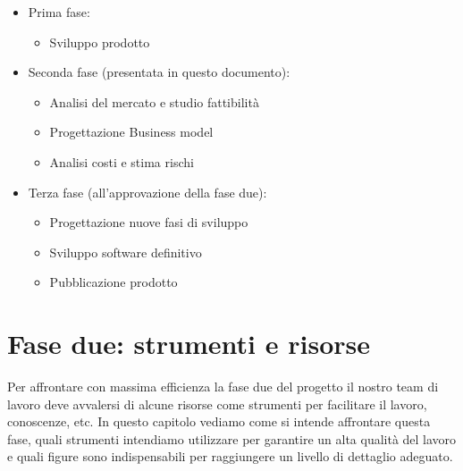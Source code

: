 \begin{itemize}
\item Prima fase:
\begin{itemize}
\item Sviluppo prodotto
\end{itemize}
\end{itemize}

\begin{itemize}
\item Seconda fase (presentata in questo documento):
\begin{itemize}
\item Analisi del mercato e studio fattibilità
\item Progettazione Business model
\item Analisi costi e stima rischi
\end{itemize}
\end{itemize}

\begin{itemize}
\item Terza fase (all'approvazione della fase due):
\begin{itemize}
\item Progettazione nuove fasi di sviluppo
\item Sviluppo software definitivo
\item Pubblicazione prodotto
\end{itemize}
\end{itemize}



\section{Fase due: strumenti e risorse}
Per affrontare con massima efficienza la fase due del progetto il nostro team di lavoro deve avvalersi di alcune risorse come strumenti per facilitare il lavoro, conoscenze, etc. In questo capitolo vediamo come si intende affrontare questa fase, quali strumenti intendiamo utilizzare per garantire un alta qualità del lavoro e quali figure sono indispensabili per raggiungere un livello di dettaglio adeguato.

